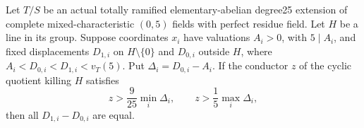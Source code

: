 \begin{lemma}
\label{lem:B-RD96-gap}
Let $T/S$ be an actual totally ramified elementary-abelian degree25
extension of
complete mixed-characteristic $(0,5)$ fields with perfect residue
field. Let $H$ be a line in its group. Suppose coordinates $x_i$
have valuations $A_i>0$, with $5\mid A_i$, and fixed displacements
$D_{1,i}$ on $H\setminus\{0\}$ and $D_{0,i}$ outside $H$, where
$A_i<D_{0,i}<D_{1,i}<v_T(5)$. Put $\Delta_i=D_{0,i}-A_i$.
If the conductor $z$ of the cyclic quotient killing $H$ satisfies
\[
 z>\frac9{25}\min_i\Delta_i,
 \qquad z>\frac15\max_i\Delta_i,
                                                        \tag{B-RD96.15}
\]
then all $D_{1,i}-D_{0,i}$ are equal.
\end{lemma}
